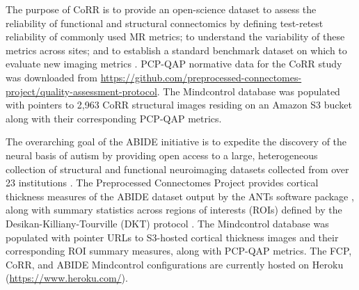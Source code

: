 The purpose of CoRR is to provide an open-science dataset to assess the reliability of functional and structural connectomics by defining test-retest reliability of commonly used MR metrics; to understand the variability of these metrics across sites; and to establish a standard benchmark dataset on which to evaluate new imaging metrics \cite{Zuo_2014}. PCP-QAP normative data for the CoRR study was downloaded from \href{http://raw.githubusercontent.com/preprocessed-connectomes-project/quality-assessment-protocol/master/poster_data/corr_anat.csv}{https://github.com/preprocessed-connectomes-project/quality-assessment-protocol}. The Mindcontrol database was populated with pointers to 2,963 CoRR structural images residing on an Amazon S3 bucket along with their corresponding PCP-QAP metrics. 

The overarching goal of the ABIDE initiative is to expedite the discovery of the neural basis of autism by providing open access to a large, heterogeneous collection of structural and functional neuroimaging datasets collected from over 23 institutions \cite{Di_Martino_2013}. The Preprocessed Connectomes Project provides cortical thickness measures of the ABIDE dataset output by the ANTs software package \cite{avants2009advanced}, along with summary statistics across regions of interests (ROIs) defined by the Desikan-Killiany-Tourville (DKT) protocol \cite{Klein_2012}. The Mindcontrol database was populated with pointer URLs to S3-hosted cortical thickness images and their corresponding ROI summary measures, along with PCP-QAP metrics. The FCP, CoRR, and ABIDE Mindcontrol configurations are currently hosted on Heroku (\href{http://www.heroku.com/}{https://www.heroku.com/}).

